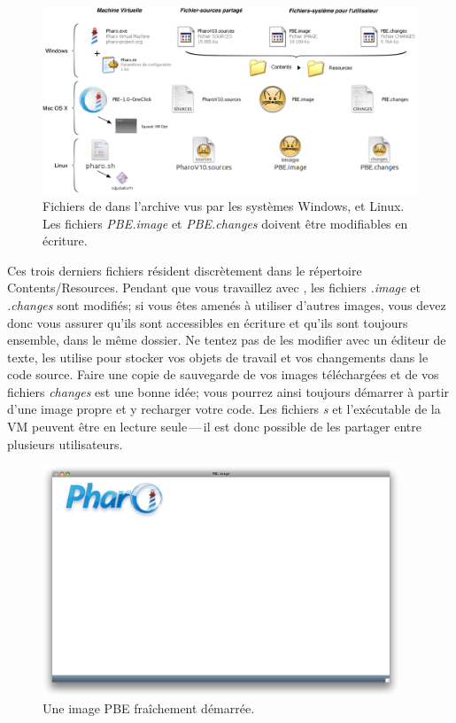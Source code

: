 \documentclass[a4paper,10pt,twoside]{book}
\begin{document}
\begin{figure}[htb]
\centerline {\includegraphics[width=\textwidth]{annotatedDownload-flat-oneclick}}
\caption{Fichiers de \pharo dans l'archive \pharooneclick{} vus par les systèmes Windows, \macosx et Linux. Les fichiers \emph{PBE.image} et \emph{PBE.changes} doivent être modifiables en écriture.}
\end{figure}

Ces trois derniers fichiers résident discrètement dans le répertoire \textsf{Contents/Resources}.
Pendant que vous travaillez avec \pharo, les fichiers \emph{.image} et \emph{.changes} sont modifiés; si vous êtes amenés à utiliser d'autres images, vous devez donc vous assurer qu'ils sont accessibles en écriture et qu'ils sont toujours ensemble, \cad dans le même dossier.
Ne tentez pas de les modifier avec un éditeur de texte, \pharo les utilise pour stocker vos objets de travail et vos changements dans le code source.
Faire une copie de sauvegarde de vos images téléchargées et de vos
fichiers \emph{changes} est une bonne idée; vous pourrez ainsi
toujours démarrer à partir d'une image propre et y recharger votre code.
Les fichiers \emph{s} et l'exécutable de la VM peuvent être
en lecture seule\,---\,il est donc possible de les partager entre plusieurs utilisateurs.

\begin{figure}[htb]
\centerline {\includegraphics[width=0.95\textwidth]{startup}}
\caption{Une image PBE fraîchement démarrée.}
\end{figure}
\end{document}
